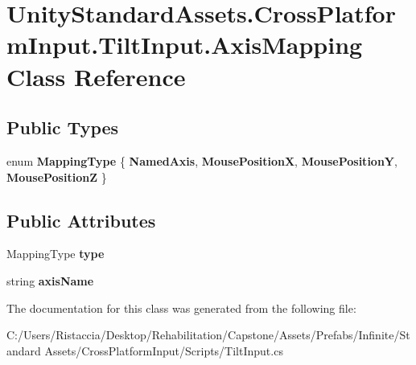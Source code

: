 \hypertarget{class_unity_standard_assets_1_1_cross_platform_input_1_1_tilt_input_1_1_axis_mapping}{}\section{Unity\+Standard\+Assets.\+Cross\+Platform\+Input.\+Tilt\+Input.\+Axis\+Mapping Class Reference}
\label{class_unity_standard_assets_1_1_cross_platform_input_1_1_tilt_input_1_1_axis_mapping}
\subsection*{Public Types}
\begin{DoxyCompactItemize}
\item 
\mbox{\label{class_unity_standard_assets_1_1_cross_platform_input_1_1_tilt_input_1_1_axis_mapping_a237892bdafa6578dcf66b355a470e58b}} 
enum {\bfseries Mapping\+Type} \{ {\bfseries Named\+Axis}, 
{\bfseries Mouse\+PositionX}, 
{\bfseries Mouse\+PositionY}, 
{\bfseries Mouse\+PositionZ}
 \}
\end{DoxyCompactItemize}
\subsection*{Public Attributes}
\begin{DoxyCompactItemize}
\item 
\mbox{\label{class_unity_standard_assets_1_1_cross_platform_input_1_1_tilt_input_1_1_axis_mapping_aba5d982b878f8b4e15867b731782ed63}} 
Mapping\+Type {\bfseries type}
\item 
\mbox{\label{class_unity_standard_assets_1_1_cross_platform_input_1_1_tilt_input_1_1_axis_mapping_a75b32887fe2065f3c67cdda50b2b9c00}} 
string {\bfseries axis\+Name}
\end{DoxyCompactItemize}


The documentation for this class was generated from the following file\+:\begin{DoxyCompactItemize}
\item 
C\+:/\+Users/\+Ristaccia/\+Desktop/\+Rehabilitation/\+Capstone/\+Assets/\+Prefabs/\+Infinite/\+Standard Assets/\+Cross\+Platform\+Input/\+Scripts/Tilt\+Input.\+cs\end{DoxyCompactItemize}
